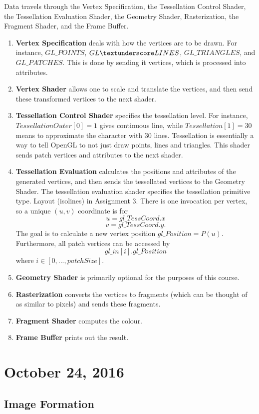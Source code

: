 \documentclass[11pt]{article}
\theoremstyle{plain} %
\theoremstyle{definition}
\theoremstyle{example}
\theoremstyle{remark}
\begin{document}
Data travels through the Vertex Specification, the Tessellation Control Shader, the Tessellation Evaluation Shader, the Geometry Shader, Rasterization, the Fragment Shader, and the Frame Buffer. 
\begin{enumerate}
	\item \textbf{Vertex Specification} deals with how the vertices are to be drawn. For instance, $GL\_POINTS$, $GL\textunderscore LINES$, $GL\_TRIANGLES$, and $GL\_PATCHES$. This is done by sending it vertices, which is processed into attributes.
	\item \textbf{Vertex Shader} allows one to scale and translate the vertices, and then send these transformed vertices to the next shader.
	\item \textbf{Tessellation Control Shader} specifies the tessellation level. For instance, $TessellationOuter[0] = 1$ gives continuous line, while $Tessellation[1] = 30$ means to approximate the character with 30 lines. Tessellation is essentially a way to tell OpenGL to not just draw points, lines and triangles. This shader sends patch vertices and attributes to the next shader. 
	\item \textbf{Tessellation Evaluation} calculates the positions and attributes of the generated vertices, and then sends the tessellated vertices to the Geometry Shader. The tessellation evaluation shader specifies the tessellation primitive type. Layout (isolines) in Assignment 3. There is one invocation per vertex, so a unique $(u,v)$ coordinate is for $$u = gl\_TessCoord.x$$ $$v = gl\_TessCoord.y.$$ The goal is to calculate a new vertex position $gl\_Position = P(u)$. Furthermore, all patch vertices can be accessed by $$gl\_in[i].gl\_Position$$ where $i \in [0,...,patchSize]$.
	\item \textbf{Geometry Shader} is primarily optional for the purposes of this course. 
	\item \textbf{Rasterization} converts the vertices to fragments (which can be thought of as similar to pixels) and sends these fragments.
	\item \textbf{Fragment Shader} computes the colour.
	\item \textbf{Frame Buffer} prints out the result.
\end{enumerate}


\section{October 24, 2016}

\subsection{Image Formation}
\end{document}
